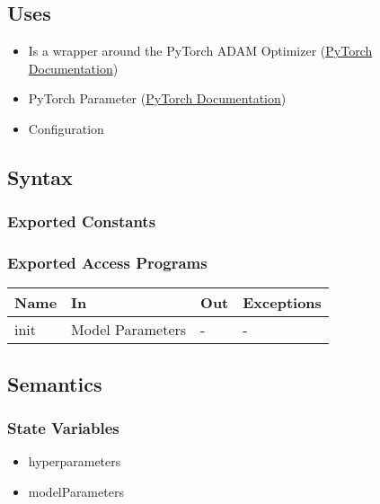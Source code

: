 \documentclass[12pt, titlepage]{article}
\begin{document}
\subsection{Uses}
\begin{itemize}
  \item Is a wrapper around the PyTorch ADAM Optimizer (\href{https://pytorch.org/docs/stable/optim.html}{PyTorch Documentation})
  \item PyTorch Parameter (\href{https://pytorch.org/docs/stable/generated/torch.nn.parameter.Parameter.html}{PyTorch Documentation})
  \item Configuration
\end{itemize}

\subsection{Syntax}



\subsubsection{Exported Constants}



\subsubsection{Exported Access Programs}

\begin{center}
\begin{tabular}{p{2cm}|p{6cm}|p{2cm}|p{2cm}}
\hline
\textbf{Name} & \textbf{In} & \textbf{Out} & \textbf{Exceptions} \\
\hline
init & Model Parameters & - & - \\
\hline
\end{tabular}
\end{center}

\subsection{Semantics}

\subsubsection{State Variables}

\begin{itemize}
  \item hyperparameters
  \item modelParameters
\end{itemize}
\end{document}
